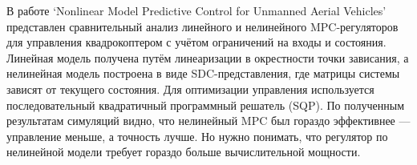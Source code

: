 В работе `Nonlinear Model Predictive Control for Unmanned
Aerial Vehicles' представлен сравнительный анализ линейного и нелинейного MPC-регуляторов для управления квадрокоптером с 
учётом ограничений на входы и состояния\cite{aerospace4020031}. Линейная модель получена путём линеаризации в окрестности точки зависания, 
а нелинейная модель построена в виде SDC-представления, 
где матрицы системы зависят от текущего состояния. Для оптимизации управления используется последовательный 
квадратичный программный решатель (SQP). 
По полученным результатам симуляций видно, что нелинейный MPC был гораздо эффективнее --- управление меньше, а 
точность лучше. Но нужно понимать, что регулятор по нелинейной модели требует гораздо больше вычислительной мощности.


\endinput